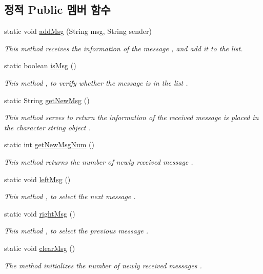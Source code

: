 \subsection*{정적 Public 멤버 함수}
\begin{DoxyCompactItemize}
\item 
static void \hyperlink{classkr_1_1ac_1_1kookmin_1_1cs_1_1sms_1_1_sms_recv_a1af0ff6d2aaddfc050a6726c4311e88e}{add\+Msg} (String msg, String sender)
\begin{DoxyCompactList}\small\item\em This method receives the information of the message , and add it to the list. \end{DoxyCompactList}\item 
static boolean \hyperlink{classkr_1_1ac_1_1kookmin_1_1cs_1_1sms_1_1_sms_recv_a7acccf1bc87b320768d8c44eda52a976}{is\+Msg} ()
\begin{DoxyCompactList}\small\item\em This method , to verify whether the message is in the list . \end{DoxyCompactList}\item 
static String \hyperlink{classkr_1_1ac_1_1kookmin_1_1cs_1_1sms_1_1_sms_recv_ad09d597c0885dfb72ac8b1d35e8eb82a}{get\+New\+Msg} ()
\begin{DoxyCompactList}\small\item\em This method serves to return the information of the received message is placed in the character string object . \end{DoxyCompactList}\item 
static int \hyperlink{classkr_1_1ac_1_1kookmin_1_1cs_1_1sms_1_1_sms_recv_ac5381dd8b65a6bc17697d4ceb3eff192}{get\+New\+Msg\+Num} ()
\begin{DoxyCompactList}\small\item\em This method returns the number of newly received message . \end{DoxyCompactList}\item 
static void \hyperlink{classkr_1_1ac_1_1kookmin_1_1cs_1_1sms_1_1_sms_recv_ac6e7d0ba1752260030b343a32e04b038}{left\+Msg} ()
\begin{DoxyCompactList}\small\item\em This method , to select the next message . \end{DoxyCompactList}\item 
static void \hyperlink{classkr_1_1ac_1_1kookmin_1_1cs_1_1sms_1_1_sms_recv_a32b0d2046140ff456a8a33a88f069b33}{right\+Msg} ()
\begin{DoxyCompactList}\small\item\em This method , to select the previous message . \end{DoxyCompactList}\item 
static void \hyperlink{classkr_1_1ac_1_1kookmin_1_1cs_1_1sms_1_1_sms_recv_a5607c963dfb2568069905b189fcc1e1e}{clear\+Msg} ()
\begin{DoxyCompactList}\small\item\em The method initializes the number of newly received messages . \end{DoxyCompactList}\end{DoxyCompactItemize}
